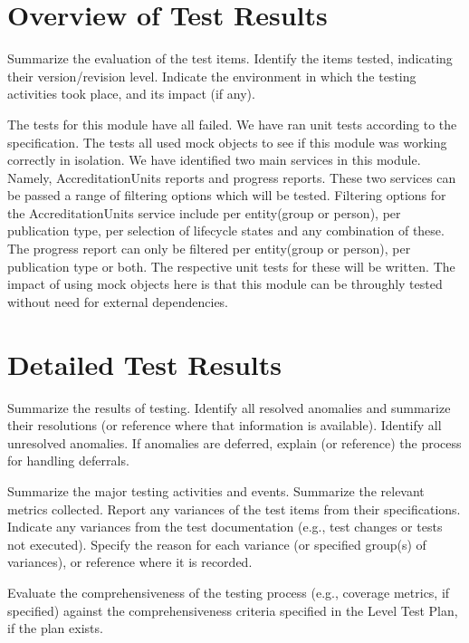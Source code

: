 
\section{Overview of Test Results}

Summarize the evaluation of the test items. Identify the items tested, indicating their version/revision
level. Indicate the environment in which the testing activities took place, and its impact (if any).

The tests for this module have all failed. We have ran unit tests according to the specification. The tests all used mock objects to see if this module was working correctly in isolation. We have identified two main services in this module. Namely, AccreditationUnits reports and  progress reports. These two services can be passed a range of filtering options which will be tested. Filtering options for the AccreditationUnits service include per entity(group or person), per publication type, per selection of lifecycle states and any combination of these. The progress report can only be filtered per entity(group or person), per publication type or both. The respective unit tests for these will be written. The impact of using mock objects here is that this module can be throughly tested without need for external dependencies. 


\section{Detailed Test Results}

Summarize the results of testing. Identify all resolved anomalies and summarize their resolutions (or
reference where that information is available). Identify all unresolved anomalies. If anomalies are
deferred, explain (or reference) the process for handling deferrals.\par

Summarize the major testing activities and events. Summarize the relevant metrics collected.
Report any variances of the test items from their specifications. Indicate any variances from the test
documentation (e.g., test changes or tests not executed). Specify the reason for each variance (or
specified group(s) of variances), or reference where it is recorded.\par

Evaluate the comprehensiveness of the testing process (e.g., coverage metrics, if specified) against the
comprehensiveness criteria specified in the Level Test Plan, if the plan exists.
